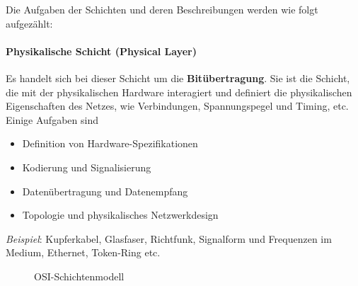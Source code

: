 Die Aufgaben der Schichten und deren Beschreibungen werden wie folgt aufgezählt: 

\paragraph{Physikalische Schicht (Physical Layer)} Es handelt sich bei dieser Schicht um die \textbf{Bitübertragung}. Sie ist die Schicht, die mit der physikalischen Hardware interagiert und definiert die physikalischen Eigenschaften des Netzes, wie Verbindungen, Spannungspegel und Timing, etc. Einige Aufgaben sind
\begin{itemize}
	\item Definition von Hardware-Spezifikationen
	\item Kodierung und Signalisierung
	\item Datenübertragung und Datenempfang
	\item Topologie und physikalisches Netzwerkdesign
\end{itemize}
\textit{Beispiel}: Kupferkabel, Glasfaser, Richtfunk, Signalform und Frequenzen im Medium, Ethernet, Token-Ring etc.

\begin{figure}[htbp]
	\centering
	\caption[OSI-Schichtenmodell]{OSI-Schichtenmodell}\label{fig:osi}
\end{figure}

